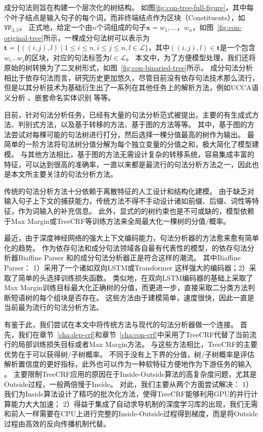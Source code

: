 
成分句法则旨在构建一个层次化的树结构。
如图\ref{fig:con-tree-full-figure}，其中每个叶子结点是输入句子的每个词，而非终端结点作为区块（Constituents），如$\texttt{VP}_{3,5}$。
正式地，给定一个由$n$个词组成的句子$\boldsymbol{x}=w_1,\dots，w_{n}$，如图~\ref{fig:con-original-tree}所示，一棵成分句法树可以表示为$\boldsymbol{t}=\{((i, j),l)\mid 1\le i \le n,i \le j \le n,l \in \mathcal{L}\}$，其中$((i,j),l) \in \boldsymbol{t}$是一个包含$w_{i}...w_{j}$的区块，对应的句法标签为$l \in \mathcal{L}$。
本文中，为了方便模型处理，我们还将原始的树转换为了二叉树形式，如图~\ref{fig:con-binaried-tree}所示。
成分句法分析相比于依存句法而言，研究历史更加悠久，尽管目前没有依存句法技术那么流行，但是以其分析技术为基础衍生出了一系列在其他任务上的解析方法，例如UCCA语义分析 \citep{jiang-etal-2019-hlt}、嵌套命名实体识别 \citep{fu-etal-2021-nested}等等。

目前，针对句法分析任务，已经有大量的句法分析范式被提出，主要的有生成式方法、判别式方法，以及基于转移的方法、基于图的方法等等。
其中，基于图的方法尝试对每棵可能的句法树进行打分，然后选择一棵分值最高的树作为输出。
最简单的一阶方法将句法树分值分解为每个独立变量的分值之和，极大简化了模型建模。
与其他方法相比，基于图的方法无需设计复杂的转移系统，容易集成丰富的特征，可以达到很高的准确率，一直以来都是最流行的句法分析方法之一，因此也是本文所主要关注的句法分析方法。

传统的句法分析方法十分依赖于离散特征的人工设计和结构化建模。
由于缺乏对输入句子上下文的捕获能力，传统方法不得不手动设计诸如前缀、后缀、词性等特征，作为词输入的补充信息。
此外，显式的的树约束也是不可或缺的，模型依赖于Max Margin或TreeCRF等训练方法来全局最大化一棵树的分值/概率。

最近，由于深度神经网络的强大上下文编码能力，句法分析器的方法愈来愈有简单化的趋势。
作为依存句法和成分句法领域各自最有代表性的模型，\citet{dozat-etal-2017-biaffine}的依存句法分析器Biaffine Parser 和\citet{stern-etal-2017-minimal}的成分句法分析器正是符合这样的潮流。
其中Biaffine Parser： 1）采用了一个诸如双向LSTM或Transformer \citep{vaswani-2017-attention}这样强大的编码器；2）采取了简单的头选择训练损失函数。
类似地，\citet{stern-etal-2017-minimal}在双向LSTM编码器的基础上采取了Max Margin训练目标最大化正确树的分值，而\citet{gaddy-etal-2018-whats}更进一步，直接采取二分类方法判断短语树的每个组块是否存在。
这些方法由于建模简单，速度很快，因此一直是当前最为流行的句法分析方法。

有鉴于此，我们尝试在本文中将传统方法与现代的句法分析器做一个连接。
首先，我们在章节~\ref{cha:dep-crf}和章节~\ref{cha:con-crf}中采用了TreeCRF代替了当前流行的局部训练损失目标或者Max Margin方法。
与这些方法相比，TreeCRF的主要优势在于可以获得树/子树概率。
不同于没有上下界的分值，树/子树概率是评估解析置信度的更好指标，此外也可以作为一种软特征方便地作为下游任务的输入 \citep{zhang-etal-2019-syntax,zhang-etal-2020-syntax}。
主要限制TreeCRF应用的原因在于Inside-Outside算法的高复杂度问题，尤其是Outside过程，一般两倍慢于Inside。
对此，我们主要从两个方面尝试解决：
1）我们为Inside算法设计了精巧的批次化方法，使得TreeCRF能够利用GPU的并行计算能力大大加速；
2）得益于集成了自动求导机制的深度学习库的出现，我们无需和前人一样需要在CPU上进行完整的Inside-Outside过程得到梯度，而是将Outside过程由高效的反向传播机制代替。

